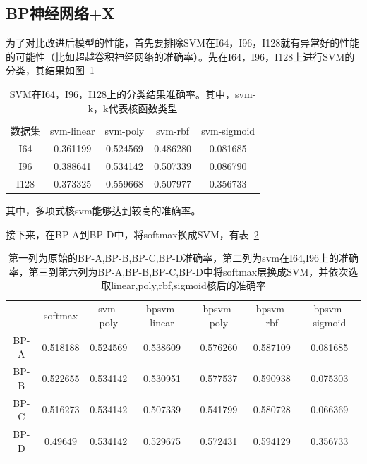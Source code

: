 \subsection{BP神经网络+X}
为了对比改进后模型的性能，首先要排除SVM在I64，I96，I128就有异常好的性能的可能性（比如超越卷积神经网络的准确率）。先在I64，I96，I128上进行SVM的分类，其结果如图~\ref{table:bpx1}
\begin{table}[htb]
\centering
\caption{SVM在I64，I96，I128上的分类结果准确率。其中，svm-k，k代表核函数类型}
\begin{tabular}{ccccc}
\toprule[2pt]
数据集 & svm-linear & svm-poly & svm-rbf & svm-sigmoid \\ 
I64 & 0.361199 & 0.524569 & 0.486280 & 0.081685 \\ 
I96 & 0.388641 & 0.534142 & 0.507339 & 0.086790 \\ 
I128 & 0.373325 & 0.559668 & 0.507977 & 0.356733 \\ 
\bottomrule[2pt]
\end{tabular}
\label{table:bpx1}
\end{table} 
其中，多项式核svm能够达到较高的准确率。

	
接下来，在BP-A到BP-D中，将softmax换成SVM，有表~\ref{table:bpx3}
\begin{table}[htb]
\centering
\caption{第一列为原始的BP-A,BP-B,BP-C,BP-D准确率，第二列为svm在I64,I96上的准确率，第三到第六列为BP-A,BP-B,BP-C,BP-D中将softmax层换成SVM，并依次选取linear,poly,rbf,sigmoid核后的准确率}
\begin{tabular}{ccccccc}
\toprule[2pt]
\ &softmax &svm-poly &bpsvm-linear & bpsvm-poly & bpsvm-rbf & bpsvm-sigmoid \\ 
BP-A & 0.518188 & 0.524569 & 0.538609 & 0.576260 & 0.587109 & 0.081685 \\ 
BP-B & 0.522655 & 0.534142 & 0.530951 & 0.577537 & 0.590938 & 0.075303 \\ 
BP-C & 0.516273 & 0.534142 & 0.507339 & 0.541799 & 0.580728 & 0.066369 \\ 
BP-D & 0.49649 & 0.534142 & 0.529675 & 0.572431 & 0.594129 & 0.356733 \\ 
\bottomrule[2pt]
\end{tabular} 
\label{table:bpx3}
\end{table}

